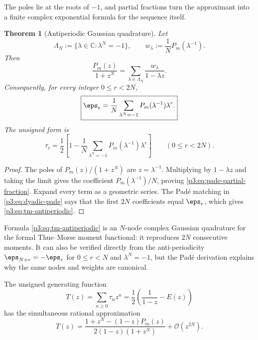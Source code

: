 \documentclass[11pt,oneside]{article}
\newtheorem{theorem}{Theorem}[section]
\theoremstyle{definition}
\newcommand{\C}{\mathbb C}
\newcommand{\bigO}{\mathcal O}
\begin{document}
The poles lie at the roots of \(-1\), and partial fractions turn the approximant into a
finite complex exponential formula for the sequence itself.

\begin{theorem}[Antiperiodic Gaussian quadrature]
\label{p3:thm:antiperiodic-quadrature}
Let
\begin{equation}
 \Lambda_N:=\{\lambda\in\C:\lambda^N=-1\},
 \qquad
 w_\lambda:=\frac1N P_m(\lambda^{-1}).                     \label{p3:eq:lambda-weights}
\end{equation}
Then
\begin{equation}
 \frac{P_m(z)}{1+z^N}
 =\sum_{\lambda\in\Lambda_N}\frac{w_\lambda}{1-\lambda z}.
                                                               \label{p3:eq:pade-partial-fraction}
\end{equation}
Consequently, for every integer \(0\le r<2N\),
\begin{equation}
\boxed{
 \eps_r=\frac1N\sum_{\lambda^N=-1}
 P_m(\lambda^{-1})\lambda^r.}                              \label{p3:eq:tm-antiperiodic}
\end{equation}
The unsigned form is
\begin{equation}
 \tau_r=\frac12\left[1-\frac1N\sum_{\lambda^N=-1}
 P_m(\lambda^{-1})\lambda^r\right]
 \qquad(0\le r<2N).                                       \label{p3:eq:tau-antiperiodic}
\end{equation}
\end{theorem}

\begin{proof}
The poles of \(P_m(z)/(1+z^N)\) are \(z=\lambda^{-1}\).  Multiplying by
\(1-\lambda z\) and taking the limit gives the coefficient
\(P_m(\lambda^{-1})/N\), proving \eqref{p3:eq:pade-partial-fraction}.  Expand every term as
a geometric series.  The Pad\'e matching in \eqref{p3:eq:dyadic-pade} says that the first
\(2N\) coefficients equal \(\eps_r\), which gives \eqref{p3:eq:tm-antiperiodic}.
\end{proof}

Formula \eqref{p3:eq:tm-antiperiodic} is an \(N\)-node complex Gaussian quadrature for the
formal Thue--Morse moment functional: it reproduces \(2N\) consecutive moments.  It can
also be verified directly from the anti-periodicity
\(\eps_{N+r}=-\eps_r\) for \(0\le r<N\) and
\(\lambda^N=-1\), but the Pad\'e derivation explains why the same nodes and weights are
canonical.

The unsigned generating function
\begin{equation}
 T(z)=\sum_{n\ge0}\tau_nz^n=\frac12\left(\frac1{1-z}-E(z)\right)                 \label{p3:eq:T-repeat}
\end{equation}
has the simultaneous rational approximation
\begin{equation}
\boxed{
 T(z)=
 \frac{1+z^N-(1-z)P_m(z)}{2(1-z)(1+z^N)}
 +\bigO(z^{2N}).}                                           \label{p3:eq:tau-pade}
\end{equation}
\end{document}
